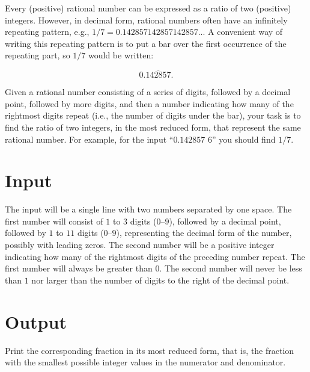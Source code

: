 
Every (positive) rational number can be expressed as a ratio of two (positive)
integers.
However, in decimal form, rational numbers often have an infinitely repeating
pattern, e.g., $1/7 = 0.142857142857142857$... A convenient way of writing this repeating pattern is to put a bar over the
first occurrence of the repeating part, so $1/7$ would be written:

$$0.\overline{142857}.$$

Given a rational number consisting of a series of digits, followed by a decimal
point, followed by more digits, and then a number indicating how many of the
rightmost digits repeat (i.e., the number of digits under the bar), your task
is to find the ratio of two integers, in the most reduced form, that represent
the same rational number.
For example, for the input ``$0.142857$ $6$'' you should find $1/7$.

\section*{Input}
The input will be a single line with two numbers separated by one space.
The first number will consist of $1$ to $3$ digits ($0$--$9$), followed by a
decimal point, followed by $1$ to $11$ digits ($0$--$9$), representing the decimal
form of the number, possibly with leading zeros.
The second number will be a positive integer indicating how many of the
rightmost digits of the preceding number repeat.
The first number will always be greater than $0$.
The second number will never be less than $1$ nor larger than the number of
digits to the right of the decimal point.

\section*{Output}
Print the corresponding fraction in its most reduced form, that is, the
fraction with the smallest possible integer values in the numerator and
denominator.
